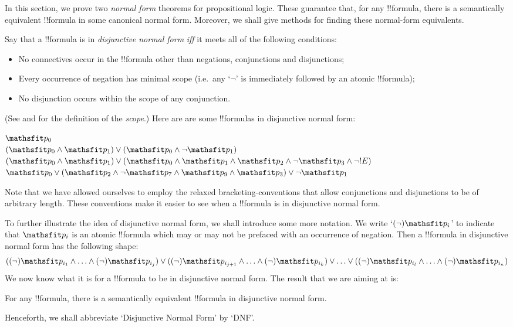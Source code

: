 \documentclass[../../../include/open-logic-section]{subfiles}
\begin{document}


In this section, we prove two \emph{normal form} theorems for propositional logic. These guarantee that, for any !!{formula}, there is a semantically equivalent !!{formula} in some canonical normal form. Moreover, we shall give methods for finding these normal-form equivalents.

Say that a !!{formula} is in \emph{disjunctive normal form} \emph{iff} it meets all of the following conditions:
	\begin{itemize}
		\item No connectives occur in the !!{formula} other than negations, conjunctions and disjunctions;
		\item Every occurrence of negation has minimal scope (i.e.\ any `$\lnot$' is immediately followed by an atomic !!{formula});
		\item No disjunction occurs within the scope of any conjunction.
	\end{itemize}
(See  and  for the definition of the \emph{scope}.) Here are are some !!{formula}s in disjunctive normal form:
	\begin{center}
		$\Obj p_0$\\
		$(\Obj p_0 \land \Obj p_1) \lor (\Obj p_0 \land \lnot \Obj p_1)$\\
		$(\Obj p_0 \land \Obj p_1) \lor (\Obj p_0 \land  \Obj p_1 \land \Obj p_2 \land \lnot \Obj p_3 \land \lnot !E)$\\
		$\Obj p_0 \lor (\Obj p_2 \land \lnot \Obj p_{7} \land \Obj p_{9} \land \Obj p_3) \lor \lnot \Obj p_1$
	\end{center}
Note that we have allowed ourselves to employ the relaxed bracketing-conventions that allow conjunctions and disjunctions to be of arbitrary length. These conventions make it easier to see when a !!{formula} is in disjunctive normal form. 

To further illustrate the idea of disjunctive normal form, we shall introduce some more notation. We write `$(\lnot) \Obj p_i$' to indicate that $\Obj p_i$ is an atomic !!{formula} which may or may not be prefaced with an occurrence of negation. Then a !!{formula} in disjunctive normal form has the following shape:
	$$((\lnot) {\Obj p_{i_1}} \land \ldots \land (\lnot) {\Obj p_{i_j}}) \lor ((\lnot) {\Obj p_{i_{j+1}}} \land \ldots \land (\lnot){\Obj p_{i_k}}) \lor \ldots \lor ((\lnot){\Obj p_{i_{l}}} \land \ldots \land (\lnot) {\Obj p_{i_n}})$$
We now know what it is for a !!{formula} to be in disjunctive normal form. The result that we are aiming at is:
	\begin{prop}
	For any !!{formula}, there is a semantically equivalent !!{formula} in disjunctive normal form.
	\end{prop}
Henceforth, we shall abbreviate `Disjunctive Normal Form' by `DNF'. 
\end{document}
